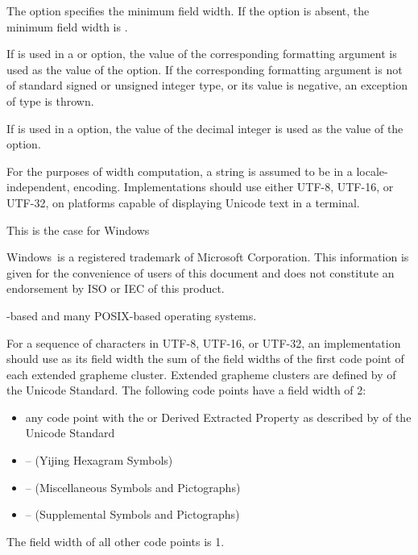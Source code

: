 \pnum
The  option specifies the minimum field width.
If the  option is absent,
the minimum field width is .

\pnum
If  is used in
a  or  option,
the value of the corresponding formatting argument is used as the value of the option.
If the corresponding formatting argument is
not of standard signed or unsigned integer type, or
its value is negative,
an exception of type  is thrown.

\pnum
If  is used in a
 option, the value of the decimal integer
is used as the value of the option.

\pnum
For the purposes of width computation,
a string is assumed to be in
a locale-independent,
 encoding.
Implementations should use either UTF-8, UTF-16, or UTF-32,
on platforms capable of displaying Unicode text in a terminal.
\begin{note}
This is the case for Windows
\begin{footnote}
Windows\textregistered\ is a registered trademark of Microsoft Corporation.
This information is given for the convenience of users of this document and
does not constitute an endorsement by ISO or IEC of this product.
\end{footnote}%
-based and
many POSIX-based operating systems.
\end{note}

\pnum
For a sequence of characters in UTF-8, UTF-16, or UTF-32,
an implementation should use as its field width
the sum of the field widths of the first code point
of each extended grapheme cluster.
Extended grapheme clusters are defined by  of the Unicode Standard.
The following code points have a field width of 2:
\begin{itemize}
\item
any code point with the  or
 Derived Extracted Property as described by
 of the Unicode Standard
\item
{} --  (Yijing Hexagram Symbols)
\item
{} --  (Miscellaneous Symbols and Pictographs)
\item
{} --  (Supplemental Symbols and Pictographs)
\end{itemize}
The field width of all other code points is 1.

